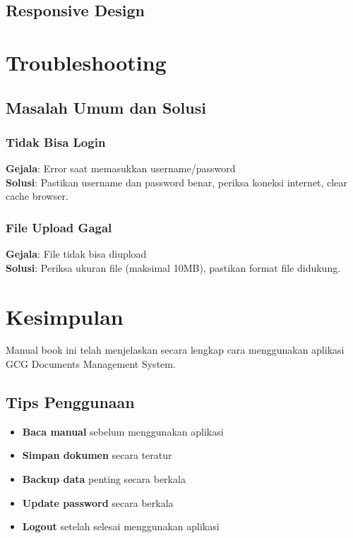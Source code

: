 \documentclass[12pt,a4paper]{article}
\begin{document}
\subsection{Responsive Design}

\section{Troubleshooting}
\subsection{Masalah Umum dan Solusi}
\subsubsection{Tidak Bisa Login}
\textbf{Gejala}: Error saat memasukkan username/password\\
\textbf{Solusi}: Pastikan username dan password benar, periksa koneksi internet, clear cache browser.

\subsubsection{File Upload Gagal}
\textbf{Gejala}: File tidak bisa diupload\\
\textbf{Solusi}: Periksa ukuran file (maksimal 10MB), pastikan format file didukung.

\section{Kesimpulan}
Manual book ini telah menjelaskan secara lengkap cara menggunakan aplikasi GCG Documents Management System.

\subsection{Tips Penggunaan}
\begin{itemize}
\item \textbf{Baca manual} sebelum menggunakan aplikasi
\item \textbf{Simpan dokumen} secara teratur
\item \textbf{Backup data} penting secara berkala
\item \textbf{Update password} secara berkala
\item \textbf{Logout} setelah selesai menggunakan aplikasi
\end{itemize}
\end{document}

